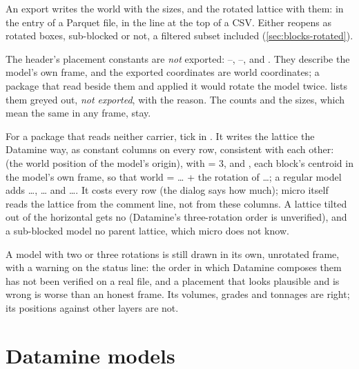 An export writes the world    with the sizes, and the rotated lattice with them: in the  entry of a Parquet file, in the  line at the top of a CSV. Either reopens as rotated boxes, sub-blocked or not, a filtered subset included (\cref{sec:blocks-rotated}).

The header's placement constants are \emph{not} exported: –, –,    and   . They describe the model's own frame, and the exported coordinates are world coordinates; a package that read  beside them and applied it would rotate the model twice.  lists them greyed out, \emph{not exported}, with the reason. The counts    and the sizes, which mean the same in any frame, stay.

\begin{tip}
For a package that reads neither  carrier, tick  in . It writes the lattice the Datamine way, as constant columns on every row, consistent with each other:    (the world position of the model's origin),  with  = 3, and   , each block's centroid in the model's own frame, so that world = … + the  rotation of …; a regular model adds …, … and …. It costs every row (the dialog says how much); micro itself reads the lattice from the comment line, not from these columns. A lattice tilted out of the horizontal gets no  (Datamine's three-rotation order is unverified), and a sub-blocked model no parent lattice, which micro does not know.
\end{tip}

A model with two or three rotations is still drawn in its own, unrotated frame, with a warning on the status line: the order in which Datamine composes them has not been verified on a real file, and a placement that looks plausible and is wrong is worse than an honest frame. Its volumes, grades and tonnages are right; its positions against other layers are not.

\section{Datamine  models}\label{sec:blocks-dm}

